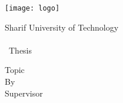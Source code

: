 \thispagestyle{empty}
\begin{center}
	\begin{latin}
		\texttt{[image: logo]} \\
		\begin{Large}
		Sharif University of Technology \\
		\enDep \\ [1cm]
		\enlevel\ Thesis \\ [6mm]
		\end{Large}
		\vskip 2cm
                \doublespacing	
		\large{Topic}      \\ \textbf{\huge{\entitle}}
		\vskip 2cm
              	\singlespacing     %
		\large{By}         \\ \Large{\enAuthor}
		\vskip 2cm
		\large{Supervisor} \\ \Large{\ensupervisor}
		\vskip 2cm
		\large{\engdate}
	\end{latin}
\end{center}


